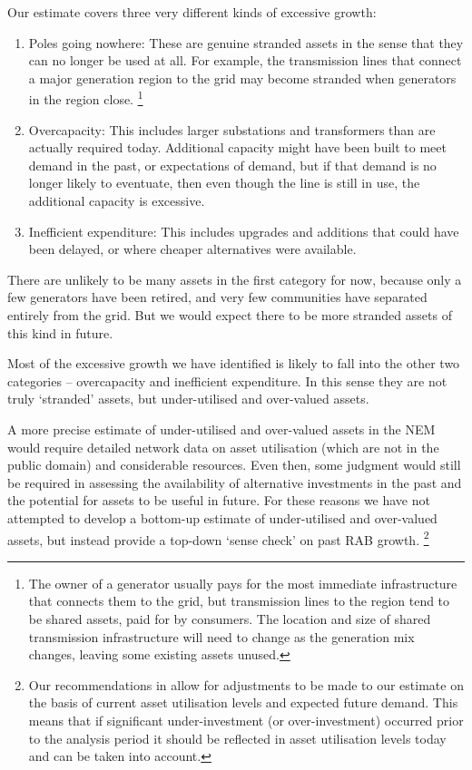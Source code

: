 \documentclass[FrontPage]{grattan}
\begin{document}
Our estimate covers three very different kinds of excessive growth:
\begin{enumerate}
 \item Poles going nowhere: These are genuine stranded assets in the sense that they can no longer be used at all. For example, the transmission lines that connect a major generation region to the grid may become stranded when generators in the region close.%
 \footnote{The owner of a generator usually pays for the most immediate infrastructure that connects them to the grid, but transmission lines to the region tend to be shared assets, paid for by consumers. The location and size of shared transmission infrastructure will need to change as the generation mix changes, leaving some existing assets unused.}
 \item Overcapacity: This includes larger substations and transformers than are actually required today. Additional capacity might have been built to meet demand in the past, or expectations of demand, but if that demand is no longer likely to eventuate, then even though the line is still in use, the additional capacity is excessive.
 \item Inefficient expenditure: This includes upgrades and additions that could have been delayed, or where cheaper alternatives were available.
\end{enumerate}

There are unlikely to be many assets in the first category for now, because only a few generators have been retired, and very few communities have separated entirely from the grid. But we would expect there to be more stranded assets of this kind in future.

Most of the excessive growth we have identified is likely to fall into the other two categories -- overcapacity and inefficient expenditure. In this sense they are not truly `stranded' assets, but under-utilised and over-valued assets.

A more precise estimate of under-utilised and over-valued assets in the NEM would require detailed network data on asset utilisation (which are not in the public domain) and considerable resources. Even then, some judgment would still be required in assessing the availability of alternative investments in the past and the potential for assets to be useful in future. For these reasons we have not attempted to develop a bottom-up estimate of under-utilised and over-valued assets, but instead provide a top-down `sense check' on past RAB growth.%
\footnote{Our recommendations in  allow for adjustments to be made to our estimate on the basis of current asset utilisation levels and expected future demand. This means that if significant under-investment (or over-investment) occurred prior to the analysis period it should be reflected in asset utilisation levels today and can be taken into account.}
\end{document}
